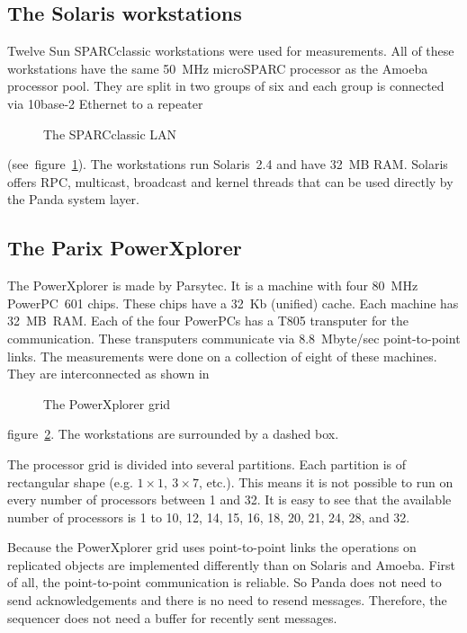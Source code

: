 \documentclass[a4paper,11pt]{article}
\begin{document}
\subsection{The Solaris workstations}
Twelve Sun SPARCclassic workstations were used for measurements. All
of these workstations have the same 50~MHz microSPARC processor as
the Amoeba processor pool. They are split in two groups of six and each
group is connected via 10base-2 Ethernet to a repeater
\begin{figure}[htbp]
\begin{center}
\caption{The SPARCclassic LAN}
\label{fig:sloep}
\end{center}
\end{figure}
(see~figure~\ref{fig:sloep}). The workstations
run Solaris~2.4 and have 32~MB RAM. Solaris offers RPC, multicast,
broadcast and kernel threads that can be used directly by the Panda
system layer.

\subsection{The Parix PowerXplorer}
The PowerXplorer is made by Parsytec. It is a
machine with four 80~MHz PowerPC~601 chips.
These chips have a 32~Kb (unified) cache. Each machine has 32~MB~RAM.
Each of the four PowerPCs has a T805 transputer for the communication.
These transputers communicate via 8.8~Mbyte/sec point-to-point links.
The measurements were done on
a collection of eight of these machines. They are interconnected
as shown in 
\begin{figure}[htbp]
\begin{center}
\caption{The PowerXplorer grid}
\label{fig:ppc-grid}
\end{center}
\end{figure}
figure~\ref{fig:ppc-grid}. The workstations are surrounded by a dashed
box.

The processor grid is divided into several partitions. Each partition is
of rectangular shape (e.g. $1 \times 1,\:3 \times 7$, etc.).
This means it is not possible to run on every
number of processors between 1 and 32. It is easy to see that the
available number of processors is 1 to 10, 12, 14, 15, 16, 18, 20, 21, 24, 28,
and 32.

Because the PowerXplorer grid uses point-to-point links the operations
on replicated objects are implemented differently than on Solaris and Amoeba.
First of all, the point-to-point communication is reliable. So Panda
does not need to send acknowledgements and there is no need to resend
messages. Therefore, the sequencer does not need a buffer for recently
sent messages.
\end{document}
